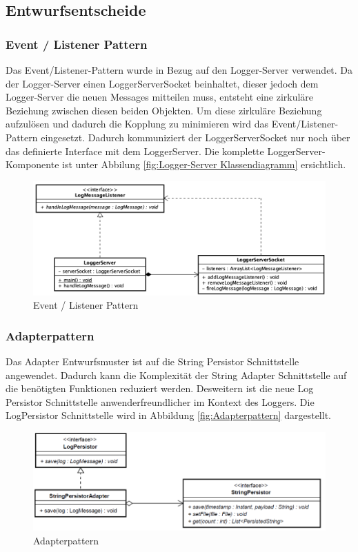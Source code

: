 \newpage
\subsection{Entwurfsentscheide}
\subsubsection{Event / Listener Pattern}
Das Event/Listener-Pattern wurde in Bezug auf den Logger-Server verwendet. Da der Logger-Server einen LoggerServerSocket beinhaltet, dieser jedoch dem Logger-Server die neuen Messages mitteilen muss, entsteht eine zirkuläre Beziehung zwischen diesen beiden Objekten. 
Um diese zirkuläre Beziehung aufzulösen und dadurch die Kopplung zu minimieren wird das Event/Listener-Pattern eingesetzt. Dadurch kommuniziert der LoggerServerSocket nur noch über das definierte Interface mit dem LoggerServer. Die komplette LoggerServer-Komponente ist unter Abbilung \ref{fig:Logger-Server Klassendiagramm} ersichtlich.
\begin{figure}[H]
	\centering
	\includegraphics[width=\textwidth]{2_Architektur/Bilder/loggerServer_EventListener.png}
	\caption{Event / Listener Pattern}
	\label{fig:Event / Listener Pattern}
\end{figure}

\subsubsection{Adapterpattern}
Das Adapter Entwurfsmuster ist auf die String Persistor Schnittstelle angewendet. Dadurch kann die Komplexität der String Adapter Schnittstelle auf die benötigten Funktionen reduziert werden. Desweitern ist die neue Log Persistor Schnittstelle anwenderfreundlicher im Kontext des Loggers. Die LogPersistor Schnittstelle wird in Abbildung \ref{fig:Adapterpattern} dargestellt.
\begin{figure}[H]
	\centering
	\includegraphics[width=\textwidth]{2_Architektur/Bilder/adapterpattern.png}
	\caption{Adapterpattern}
	\label{fig:Adapterpatternn}
\end{figure}

